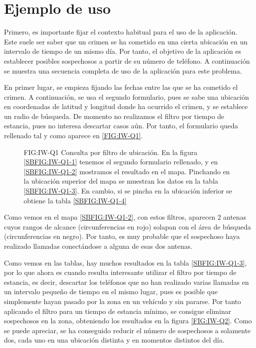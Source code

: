   \section{Ejemplo de uso}
    Primero, es importante fijar el contexto habitual para el uso de la aplicación. Este suele ser saber que un crimen se ha cometido en una cierta ubicación en un intervalo de tiempo de un mismo día. Por tanto, el objetivo de la aplicación es establecer posibles sospechosos a partir de su número de teléfono.
    A continuación se muestra una secuencia completa de uso de la aplicación para este problema.
    
    En primer lugar, se empieza fijando las fechas entre las que se ha cometido el crimen. A continuación, se usa el segundo formulario, pues se sabe una ubicación en coordenadas de latitud y longitud donde ha ocurrido el crimen, y se establece un radio de búsqueda. De momento no realizamos el filtro por tiempo de estancia, pues no interesa descartar casos aún. Por tanto, el formulario queda rellenado tal y como aparece en \ref{FIG:IW-Q1}.
    
    \begin{figure}[Consulta por filtro de ubicación]{FIG:IW-Q1}
      {Consulta por filtro de ubicación. En la figura \ref{SBFIG:IW-Q1-1} tenemos el segundo formulario rellenado, y en \ref{SBFIG:IW-Q1-2} mostramos el resultado en el mapa. Pinchando en la ubicación superior del mapa se muestran los datos en la tabla \ref{SBFIG:IW-Q1-3}. En cambio, si se pincha en la ubicación inferior se obtiene la tabla \ref{SBFIG:IW-Q1-4}}
      \quad
      \quad
      \quad
    \end{figure}
  
    Como vemos en el mapa \ref{SBFIG:IW-Q1-2}, con estos filtros, aparecen 2 antenas cuyos rangos de alcance (circunferencias en rojo) solapan con el área de búsqueda (circunferencias en negro). Por tanto, es muy probable que el sospechoso haya realizado llamadas conectándose a alguna de esas dos antenas.
    
    Como vemos en las tablas, hay muchos resultados en la tabla \ref{SBFIG:IW-Q1-3}, por lo que ahora es cuando resulta interesante utilizar el filtro por tiempo de estancia, es decir, descartar los teléfonos que no han realizado varias llamadas en un intervalo pequeño de tiempo en el mismo lugar, pues es posible que simplemente hayan pasado por la zona en un vehículo y sin pararse. 
    Por tanto aplicando el filtro para un tiempo de estancia mínimo, se consigue eliminar sospechosos en la zona, obteniendo los resultados en la figura \ref{FIG:IW-Q2}.    Como se puede apreciar, se ha conseguido reducir el número de sospechosos a solamente dos, cada uno en una ubicación distinta y en momentos distintos del día.
    
